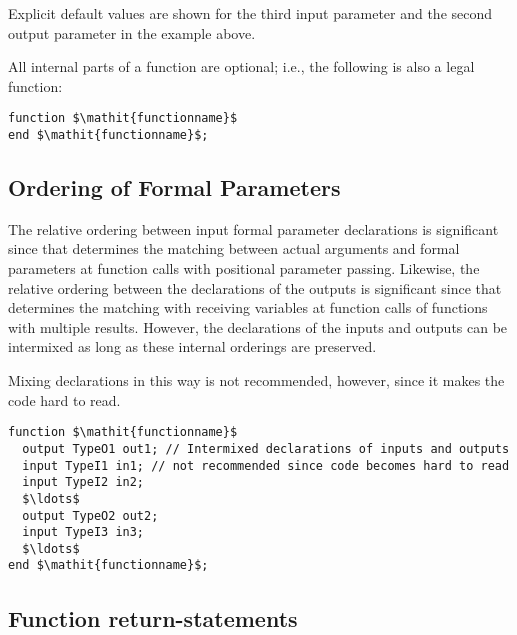\begin{nonnormative}
Explicit default values are shown for the third input parameter and the second output parameter in the example above.
\end{nonnormative}

\begin{nonnormative}
All internal parts of a function are optional; i.e., the following is also a legal function:
\begin{lstlisting}[language=modelica]
function $\mathit{functionname}$
end $\mathit{functionname}$;
\end{lstlisting}
\end{nonnormative}

\subsection{Ordering of Formal Parameters}\label{ordering-of-formal-parameters}

The relative ordering between input formal parameter declarations is
significant since that determines the matching between actual arguments
and formal parameters at function calls with positional parameter
passing. Likewise, the relative ordering between the declarations of the
outputs is significant since that determines the matching with receiving
variables at function calls of functions with multiple results. However,
the declarations of the inputs and outputs can be intermixed as long as
these internal orderings are preserved.

\begin{nonnormative}
Mixing declarations in this way is not recommended, however, since it makes the code hard to read.
\end{nonnormative}

\begin{example}
\begin{lstlisting}[language=modelica]
function $\mathit{functionname}$
  output TypeO1 out1; // Intermixed declarations of inputs and outputs
  input TypeI1 in1; // not recommended since code becomes hard to read
  input TypeI2 in2;
  $\ldots$
  output TypeO2 out2;
  input TypeI3 in3;
  $\ldots$
end $\mathit{functionname}$;
\end{lstlisting}
\end{example}

\subsection{Function return-statements}\label{function-return-statements}

